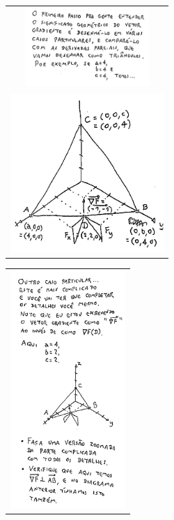 \documentclass[oneside,12pt]{article}
\begin{document}
\begin{tabular}[c]{c}
\includegraphics[height=3cm]{2020-2-C3/20210430_grad_444_intro.pdf}
\\[-10pt]
\includegraphics[height=6.0cm]{2020-2-C3/20210430_grad_444.pdf}
\end{tabular}
%
\quad
%
\begin{tabular}[c]{c}
\includegraphics[height=9cm]{2020-2-C3/20210430_grad_422.pdf}
\end{tabular}
\end{document}

